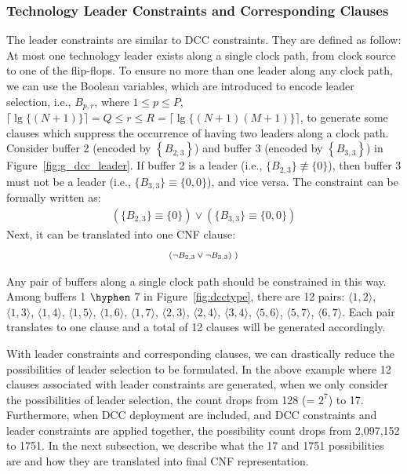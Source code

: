 \subsubsection{Technology Leader Constraints and Corresponding Clauses}
\label{sec:TVA:dcc_c}
The leader constraints are similar to DCC constraints. They are defined as follow: At most one technology leader exists along a single clock path, from clock source to one of the flip-flops. To ensure no more than one leader along any clock path, we can use the Boolean variables, which are introduced to encode leader selection, i.e., $B_{p,r}$, where $1 \leq p \leq P$, $\lceil \lg \{(N + 1)\} \rceil = Q \leq r \leq R = \lceil \lg \{(N + 1)(M + 1)\} \rceil$, to generate some clauses which suppress the occurrence of having two leaders along a clock path. Consider buffer 2 (encoded by $\left\{B_{2,3}\right\}$) and buffer 3 (encoded by $\left\{B_{3,3}\right\}$) in Figure~\ref{fig:g_dcc_leader}. If buffer 2 is a leader (i.e., $\{B_{2,3}\} \not\equiv \{0\}$), then buffer 3 must not be a leader (i.e., $\{B_{3,3}\} \equiv \{0, 0\}$), and vice versa. The constraint can be formally written as:
\begin{gather*}
\left(\{B_{2,3}\} \equiv \{0\}\right) \lor \left(\{B_{3,3}\} \equiv \{0, 0\}\right)
\end{gather*}
Next, it can be translated into one CNF clause:
\begin{gather*}
\mbox{\fontsize{7}{8.4}\selectfont ($\neg B_{2,3}\lor\neg B_{3,3}$) )} 
\end{gather*}

Any pair of buffers along a single clock path should be constrained in this way. Among buffers 1 $\hyphen$ 7 in Figure~\ref{fig:dcctype}, there are 12 pairs: $\langle1, 2\rangle$, $\langle1, 3\rangle$, $\langle1, 4\rangle$, $\langle1, 5\rangle$, $\langle1, 6\rangle$, $\langle1, 7\rangle$, $\langle2, 3\rangle$, $\langle2, 4\rangle$, $\langle3, 4\rangle$, $\langle5, 6\rangle$, $\langle5, 7\rangle$, $\langle6, 7\rangle$. Each pair translates to one clause and a total of 12 clauses will be generated accordingly.

With leader constraints and corresponding clauses, we can drastically reduce the possibilities of leader selection to be formulated. In the above example where 12 clauses associated with leader constraints are generated, when we only consider the possibilities of leader selection, the count drops from 128 (= $2^7$) to 17. Furthermore, when DCC deployment are included, and DCC constraints and leader constraints are applied together, the possibility count drops from 2,097,152 to 1751. In the next subsection, we describe what the 17 and 1751 possibilities are and how they are translated into final CNF representation.


